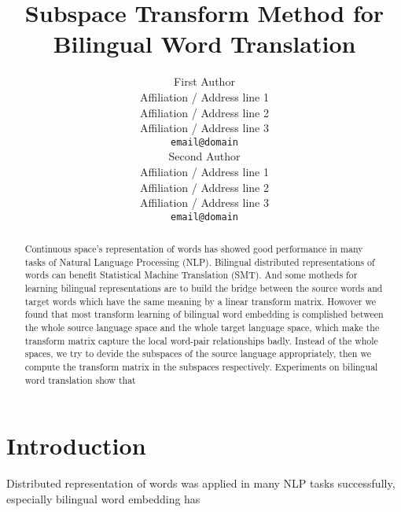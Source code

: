 \documentclass[11pt]{article}
\title{Subspace Transform Method for Bilingual Word Translation}
\author{First Author \\
  Affiliation / Address line 1 \\
  Affiliation / Address line 2 \\
  Affiliation / Address line 3 \\
  {\tt email@domain} \\\And
  Second Author \\
  Affiliation / Address line 1 \\
  Affiliation / Address line 2 \\
  Affiliation / Address line 3 \\
  {\tt email@domain} \\}
\date{}
\begin{document}
\maketitle
\begin{abstract}
Continuous space's representation of words has showed good performance in many tasks of Natural
Language Processing (NLP). Bilingual distributed representations of words can benefit Statistical Machine
Translation (SMT). And some motheds for learning bilingual representations are to build the bridge between the source words and target words which have the same meaning by a linear transform matrix. Howover we found that most transform learning of bilingual word embedding is complished between the whole source language space and the whole target language space, which make the transform matrix capture the local word-pair relationships badly.
Instead of the whole spaces, we try to devide the subspaces of the source language appropriately, then we compute the transform matrix in the subspaces respectively. Experiments on bilingual word translation show that 
\end{abstract}

\section{Introduction}
\label{intro}

%
% 
Distributed representation of words was applied in many NLP tasks successfully, especially bilingual word embedding has  
\end{document}
